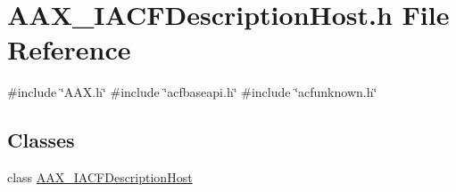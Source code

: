 \hypertarget{a00518}{}\section{A\+A\+X\+\_\+\+I\+A\+C\+F\+Description\+Host.\+h File Reference}
\label{a00518}
{\ttfamily \#include \char`\"{}A\+A\+X.\+h\char`\"{}}\newline
{\ttfamily \#include \char`\"{}acfbaseapi.\+h\char`\"{}}\newline
{\ttfamily \#include \char`\"{}acfunknown.\+h\char`\"{}}\newline
\subsection*{Classes}
\begin{DoxyCompactItemize}
\item 
class \mbox{\hyperlink{a01649}{A\+A\+X\+\_\+\+I\+A\+C\+F\+Description\+Host}}
\end{DoxyCompactItemize}
